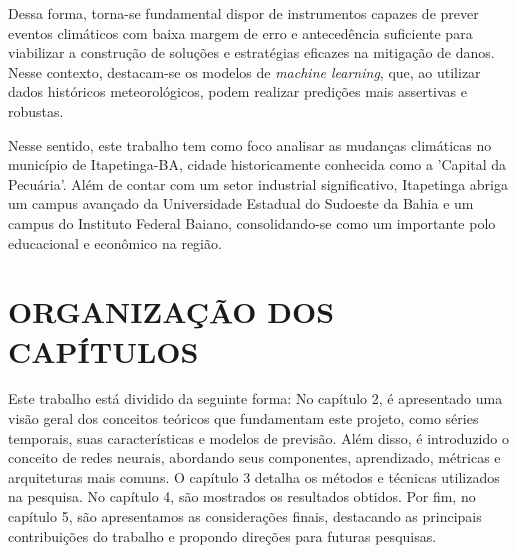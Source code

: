     
    Dessa forma, torna-se fundamental dispor de instrumentos capazes de prever eventos climáticos com baixa margem de erro 
    e antecedência suficiente para viabilizar a construção de soluções e estratégias eficazes na mitigação de danos. 
    Nesse contexto, destacam-se os modelos de \emph{machine learning}, que, ao utilizar dados históricos meteorológicos, podem 
    realizar predições mais assertivas e robustas.
    
    Nesse sentido, este trabalho tem como foco analisar as mudanças climáticas no município de Itapetinga-BA, 
    cidade historicamente conhecida como a 'Capital da Pecuária'. Além de contar com um setor industrial 
    significativo, Itapetinga abriga um campus avançado da Universidade Estadual do Sudoeste da Bahia e um campus 
    do Instituto Federal Baiano, consolidando-se como um importante polo educacional e econômico na região.

\section{ORGANIZAÇÃO DOS CAPÍTULOS}
    Este trabalho está dividido da seguinte forma: No capítulo 2, é apresentado uma visão geral dos conceitos teóricos que 
    fundamentam este projeto, como séries temporais, suas características e modelos de previsão. Além disso, é introduzido o 
    conceito de redes neurais, abordando seus componentes, aprendizado, métricas e arquiteturas mais comuns. O capítulo 3 
    detalha os métodos e técnicas utilizados na pesquisa. No capítulo 4, são mostrados os resultados obtidos. Por fim, no 
    capítulo 5, são apresentamos as considerações finais, destacando as principais contribuições do trabalho e propondo direções 
    para futuras pesquisas.